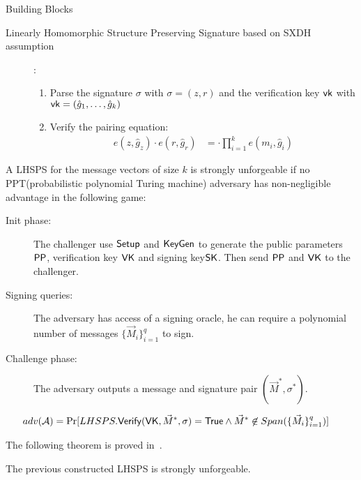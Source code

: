 \begin{subsection}{Building Blocks}
\begin{myDef}{Linearly Homomorphic Structure Preserving Signature based on SXDH assumption~\cite{DBLP:conf/crypto/LibertPJY13}}
\begin{description}
    \item[]:
      \begin{enumerate}
      \item Parse the signature $\sigma$ with $\sigma = (z, r)$ and the verification key $\mathsf{vk}$ with $\mathsf{vk} = (\hat{g}_1, \dots, \hat{g}_k)$
      \item Verify the pairing equation:
        \begin{align*}
          e(z, \hat{g}_z) \cdot e(r, \hat{g}_r) &=  \cdot \prod_{i = 1}^ke(m_i, \hat{g}_i)
        \end{align*}
      \end{enumerate}
    \end{description}
  \end{myDef}


  \begin{myDef} A LHSPS for the message vectors of size $k$ is strongly unforgeable if no PPT(probabilistic polynomial Turing machine) adversary has non-negligible advantage in the following game:
    \begin{description}
    \item[Init phase: ]The challenger use ${\mathsf{Setup}}$ and ${\mathsf{KeyGen}}$ to generate the public parameters $\mathsf{PP}$, verification key $\mathsf{VK}$ and signing key$\mathsf{SK}$. Then send $\mathsf{PP}$ and $\mathsf{VK}$ to the challenger.
    \item[Signing queries: ] The adversary has access of a signing oracle, he can require a polynomial number of messages $\{\vec{M}_i\}_{i = 1}^q$ to sign. 
    \item[Challenge phase: ] The adversary outputs a message and signature pair $(\vec{M}^*, \sigma^*)$.
    \end{description}

    \begin{align*}
      adv(\mathcal{A}) &= \operatorname{Pr}[LHSPS.{\mathsf{Verify}}(\mathsf{VK}, \vec{M}^* , \sigma) = \mathsf{True} \wedge \vec{M}^* \not \in Span(\{\vec{M}_i\}_{i=1}^q)]
    \end{align*}

  \end{myDef}

  The following theorem is proved in~\cite{DBLP:journals/dcc/LibertPJY15}.
  
  \begin{myTh}
    The previous constructed LHSPS is strongly unforgeable.
  \end{myTh}
  


\end{subsection}
